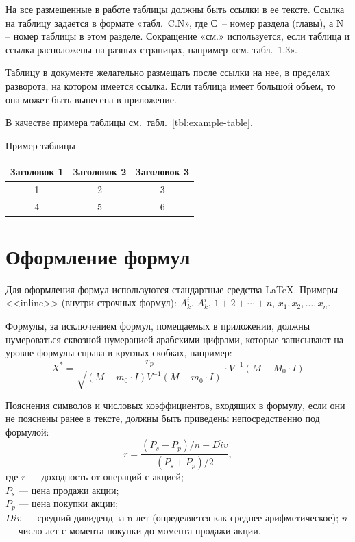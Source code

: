 \documentclass[PI,VKR]{HSEUniversity}
\begin{document}
На все размещенные в работе таблицы должны быть ссылки в ее тексте. Ссылка на таблицу задается в формате «табл. C.N», где С – номер раздела (главы), а N – номер таблицы в этом разделе. Сокращение «см.» используется, если таблица и ссылка расположены на разных страницах, например «см. табл. 1.3».

Таблицу в документе желательно размещать после ссылки на нее, в пределах разворота, на котором имеется ссылка. Если таблица имеет большой объем, то она может быть вынесена в приложение.

В качестве примера таблицы см.~табл.~\ref{tbl:example-table}.

\begin{TABLE}[h]{Пример таблицы\label{tbl:example-table}}
	\begin{tabular}{c|cc}
		\hline\hline %
		Заголовок 1 & Заголовок 2 & Заголовок 3 \\ 
		\hline %
		1 & 2 & 3 \\
		4 & 5 & 6 \\
		\hline\hline %
	\end{tabular}
\end{TABLE}

\section{Оформление формул}

Для оформления формул используются стандартные средства \LaTeX{}. Примеры <<inline>> (внутри-строчных формул): $A^i_k$, $A_k^i$, $1+2+\cdots+n$, $x_1, x_2, \dots, x_n$.

Формулы, за исключением формул, помещаемых в приложении, должны нумероваться сквозной нумерацией арабскими цифрами, которые записывают на уровне формулы справа в круглых скобках, например:
\begin{equation}
	X^* = \frac{r_p}{\sqrt{(M-m_0\cdot I)V^{-1}(M-m_0\cdot I)}}\cdot V^{-1}(M-M_0\cdot I)
	\label{eq:formula-1}
\end{equation}

Пояснения символов и числовых коэффициентов, входящих в формулу, если они не пояснены ранее в тексте, должны быть приведены непосредственно под формулой:
\begin{equation}
	r = \frac{(P_s-P_p)/n + \overline{Div}}{(P_s + P_p)/2},
	\label{eq:formula-2}
\end{equation}
где $r$ --- доходность от операций с акцией;\\
$P_s$ --- цена продажи акции;\\
$P_p$ --- цена покупки акции;\\
$\overline{Div}$ --- средний дивиденд за n лет (определяется как среднее арифметическое); 
$n$ --- число лет с момента покупки до момента продажи акции.
\end{document}

